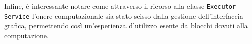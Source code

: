 Infine, \`e interessante notare come attraverso il ricorso alla classe {\tt Executor- Service} l'onere computazionale sia stato scisso dalla gestione dell'interfaccia grafica, permettendo cos\`i un'esperienza d'utilizzo esente da blocchi dovuti alla computazione.



